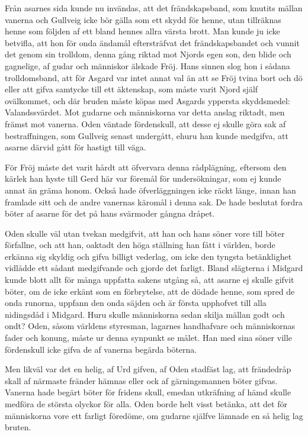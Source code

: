 Från asarnes sida kunde nu invändas, att det frändskapsband, som knutits
mällan vanerna och Gullveig icke bör gälla som ett skydd för henne, utan
tillräknas henne som följden af ett bland hennes allra värsta brott. Man
kunde ju icke betvifla, att hon för onda ändamål eftersträfvat det
frändskapsbandet och vunnit det genom sin trolldom, denna gång riktad
mot Njords egen son, den blide och gagnelige, af gudar och människor
älskade Fröj. Hans sinnen slog hon i sådana trolldomsband, att för
Asgard var intet annat val än att se Fröj tvina bort och dö eller att
gifva samtycke till ett äktenskap, som måste varit Njord själf
ovälkommet, och där bruden måste köpas med Asgards yppersta skyddsmedel:
Valandssvärdet. Mot gudarne och människorna var detta anslag riktadt,
men främst mot vanerna. Oden väntade fördenskull, att desse ej skulle
göra sak af bestraffningen, som Gullveig senast undergått, ehuru han
kunde medgifva, att asarne därvid gått för hastigt till väga.

För Fröj måste det varit hårdt att öfvervara denna rådplägning, eftersom
den kärlek han hyste till Gerd här var föremål för undersökningar, som
ej kunde annat än gräma honom. Också hade öfverläggningen icke räckt
länge, innan han framlade sitt och de andre vanernas käromål i denna
sak. De hade beslutat fordra böter af asarne för det på hans svärmoder
gångna dråpet.

Oden skulle väl utan tvekan medgifvit, att han och hans söner vore till
böter förfallne, och att han, oaktadt den höga ställning han fått i
världen, borde erkänna sig skyldig och gifva billigt vederlag, om icke
den tyngsta betänklighet vidlådde ett sådant medgifvande och gjorde det
farligt. Bland slägterna i Midgard kunde blott allt för många uppfatta
sakens utgång så, att asarne ej skulle gifvit böter, om de icke erkänt
som en förbrytelse, att de dödade henne, som spred de onda runorna,
uppfann den onda säjden och är första upphofvet till alla nidingsdåd i
Midgard. Huru skulle människorna sedan skilja mällan godt och ondt?
Oden, såsom världens styresman, lagarnes handhafvare och människornas
fader och konung, måste ur denna synpunkt se målet. Han med sina söner
ville fördenskull icke gifva de af vanerna begärda böterna.

Men likväl var det en helig, af Urd gifven, af Oden stadfäst lag, att
frändedråp skall af närmaste fränder hämnas eller ock af gärningsmannen
böter gifvas. Vanerna hade begärt böter för fridens skull, emedan
utkräfning af hämd skulle medföra de största olyckor för alla. Oden
borde helt visst betänka, att det för människorna vore ett farligt
föredöme, om gudarne själfve lämnade en så helig lag bruten.

